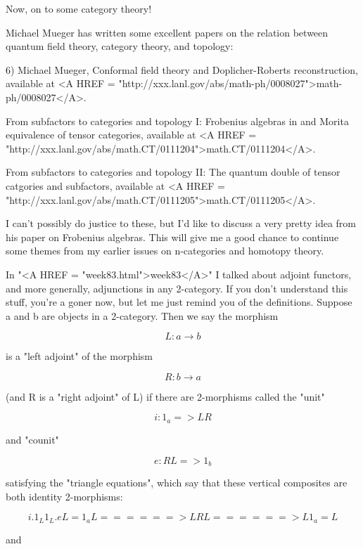 Now, on to some category theory!

Michael Mueger has written some excellent papers on the relation
between quantum field theory, category theory, and topology:

6) Michael Mueger, Conformal field theory and Doplicher-Roberts
reconstruction, available at <A HREF = "http://xxx.lanl.gov/abs/math-ph/0008027">math-ph/0008027</A>.

From subfactors to categories and topology I:
Frobenius algebras in and Morita equivalence of tensor categories,
available at <A HREF = "http://xxx.lanl.gov/abs/math.CT/0111204">math.CT/0111204</A>.

From subfactors to categories and topology II: The quantum double
of tensor catgories and subfactors, available at <A HREF = "http://xxx.lanl.gov/abs/math.CT/0111205">math.CT/0111205</A>.

I can't possibly do justice to these, but I'd like to discuss a very
pretty idea from his paper on Frobenius algebras.  This will give me a
good chance to continue some themes from my earlier issues on
n-categories and homotopy theory.

In "<A HREF = "week83.html">week83</A>" I talked about adjoint functors, and more generally, 
adjunctions in any 2-category.  If you don't understand this stuff,
you're a goner now, but let me just remind you of the definitions. 
Suppose a and b are objects in a 2-category.  Then we say the morphism


$$

L: a \to  b
$$
    
is a "left adjoint" of the morphism


$$

R: b \to  a
$$
    
(and R is a "right adjoint" of L) if there are 2-morphisms called
the "unit"


$$

i: 1_{a} => LR
$$
    
and "counit"


$$

e: RL => 1_{b}
$$
    
satisfying the "triangle equations", which say that these
vertical composites are both identity 2-morphisms:


$$

          i.1_{L}        1_{L}.e
L = 1_{a} L ======> LRL ======> L 1_{a} = L
$$
    
and

$$

